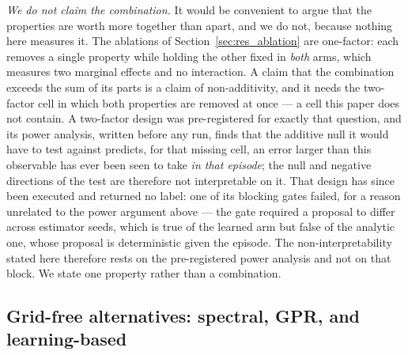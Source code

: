 \documentclass[review]{elsarticle}
\begin{document}
\emph{We do not claim the combination.} It would be convenient to argue that the
properties are worth more together than apart, and we do not, because nothing here
measures it. The ablations of Section~\ref{sec:res_ablation} are one-factor: each
removes a single property while holding the other fixed in \emph{both} arms, which
measures two marginal effects and no interaction. A claim that the combination
exceeds the sum of its parts is a claim of non-additivity, and it needs the
two-factor cell in which both properties are removed at once --- a cell this paper
does not contain. A two-factor design was pre-registered for exactly that question,
and its power analysis, written before any run, finds that the additive null it would
have to test against predicts, for that missing cell, an error larger than this
observable has ever been seen to take \emph{in that episode}; the null and negative directions of the test
are therefore not interpretable on it. That design has since been executed and
returned no label: one of its blocking gates failed, for a reason unrelated to the
power argument above --- the gate required a proposal to differ across estimator
seeds, which is true of the learned arm but false of the analytic one, whose
proposal is deterministic given the episode. The non-interpretability stated here
therefore rests on the pre-registered power analysis and not on that block. We state
one property rather than a combination.

\subsection{Grid-free alternatives: spectral, GPR, and learning-based}
\end{document}
